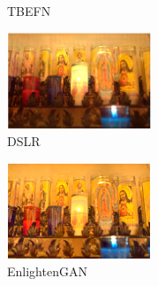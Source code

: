 \documentclass[letterpaper,12pt]{article}
\begin{document}
\begin{figure}[htbp]
\begin{subfigure}{0.18\textwidth}
			\captionsetup{font=scriptsize}
			\caption{TBEFN}
			\label{fig: MIT-Adobe_FiveK_h}  
		\end{subfigure}
		\begin{subfigure}{0.18\textwidth}
			\includegraphics[width=\linewidth]{MIT-Adobe_FiveK/DSLR}
			\captionsetup{font=scriptsize}
			\caption{DSLR}
			\label{fig: MIT-Adobe_FiveK_i}  
		\end{subfigure}
		\begin{subfigure}{0.18\textwidth}
			\includegraphics[width=\linewidth]{MIT-Adobe_FiveK/EnlightenGAN}
			\captionsetup{font=scriptsize}
			\caption{EnlightenGAN}
			\label{fig: MIT-Adobe_FiveK_j}  
		\end{subfigure}\\
		\begin{subfigure}{0.18\textwidth}

\end{subfigure}
\end{figure}
\end{document}
